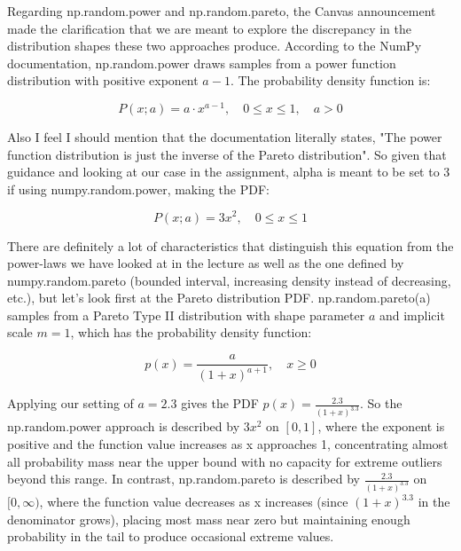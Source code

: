 Regarding np.random.power and np.random.pareto, the Canvas announcement made the clarification that we are meant to explore the discrepancy in the distribution shapes these two approaches produce. According to the NumPy documentation, np.random.power draws samples from a power function distribution with positive exponent $a - 1$. The probability density function is:

$$
P(x; a) = a \cdot x^{a-1}, \quad 0 \le x \le 1, \quad a > 0
$$

Also I feel I should mention that the documentation literally states, "The power function distribution is just the inverse of the Pareto distribution". So given that guidance and looking at our case in the assignment, alpha is meant to be set to 3 if using numpy.random.power, making the PDF:

$$
P(x; a) = 3x^2, \quad 0 \le x \le 1
$$

There are definitely a lot of characteristics that distinguish this equation from the power-laws we have looked at in the lecture as well as the one defined by numpy.random.pareto (bounded interval, increasing density instead of decreasing, etc.), but let's look first at the Pareto distribution PDF. np.random.pareto(a) samples from a Pareto Type II distribution with shape parameter $a$ and implicit scale $m=1$, which has the probability density function:

$$
p(x) = \frac{a}{(1+x)^{a+1}}, \quad x \ge 0
$$

Applying our setting of $a=2.3$ gives the PDF $ p(x) = \frac{2.3}{(1+x)^{3.3}}$. So the np.random.power approach is described by $ 3x^2 $ on $ [0,1] $, where the exponent is positive and the function value increases as x approaches 1, concentrating almost all probability mass near the upper bound with no capacity for extreme outliers beyond this range. In contrast, np.random.pareto is described by $ \frac{2.3}{(1+x)^{3.3}} $ on $ [0, \infty) $, where the function value decreases as x increases (since $(1+x)^{3.3}$ in the denominator grows), placing most mass near zero but maintaining enough probability in the tail to produce occasional extreme values.\\

